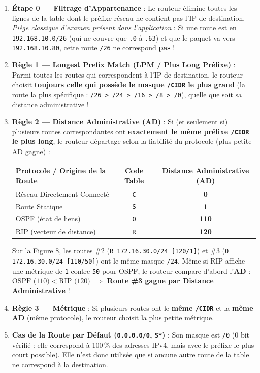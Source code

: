 \documentclass[11pt,a4paper]{article}
\begin{document}
\begin{enumerate}
    \item \textbf{Étape 0 — Filtrage d'Appartenance} : Le routeur élimine toutes les lignes de la table dont le préfixe réseau ne contient pas l'IP de destination.
    \textit{Piège classique d'examen présent dans l'application} : Si une route est en \texttt{192.168.10.0/26} (qui ne couvre que \texttt{.0} à \texttt{.63}) et que le paquet va vers \texttt{192.168.10.80}, cette route \texttt{/26} ne correspond \textbf{pas} !
    \item \textbf{Règle 1 — Longest Prefix Match (LPM / Plus Long Préfixe)} :
    Parmi toutes les routes qui correspondent à l'IP de destination, le routeur choisit \textbf{toujours celle qui possède le masque \texttt{/CIDR} le plus grand} (la route la plus spécifique : \texttt{/26 > /24 > /16 > /8 > /0}), quelle que soit sa distance administrative !
    \item \textbf{Règle 2 — Distance Administrative (AD)} :
    Si (et seulement si) plusieurs routes correspondantes ont \textbf{exactement le même préfixe \texttt{/CIDR} le plus long}, le routeur départage selon la fiabilité du protocole (plus petite AD gagne) :
    \begin{center}
    \begin{tabular}{@{}lcc@{}}
    \toprule
    \textbf{Protocole / Origine de la Route} & \textbf{Code Table} & \textbf{Distance Administrative (AD)} \\
    \midrule
    Réseau Directement Connecté & \texttt{C}  & \textbf{0}   \\
    Route Statique              & \texttt{S}  & \textbf{1}   \\
    OSPF (état de liens)        & \texttt{O}  & \textbf{110} \\
    RIP (vecteur de distance)   & \texttt{R}  & \textbf{120} \\
    \bottomrule
    \end{tabular}
    \end{center}
    Sur la Figure 8, les routes \#2 (\texttt{R 172.16.30.0/24 [120/1]}) et \#3 (\texttt{O 172.16.30.0/24 [110/50]}) ont le même masque \texttt{/24}. Même si RIP affiche une métrique de \texttt{1} contre \texttt{50} pour OSPF, le routeur compare d'abord l'\textbf{AD} : $\text{OSPF (110)} < \text{RIP (120)} \implies$ \textbf{Route \#3 gagne par Distance Administrative} !
    \item \textbf{Règle 3 — Métrique} :
    Si plusieurs routes ont le \textbf{même \texttt{/CIDR}} et la \textbf{même AD} (même protocole), le routeur choisit la plus petite métrique.
    \item \textbf{Cas de la Route par Défaut (\texttt{0.0.0.0/0}, \texttt{S*})} :
    Son masque est \texttt{/0} (0 bit vérifié : elle correspond à 100\,\% des adresses IPv4, mais avec le préfixe le plus court possible). Elle n'est donc utilisée que si aucune autre route de la table ne correspond à la destination.
\end{enumerate}
\end{document}
